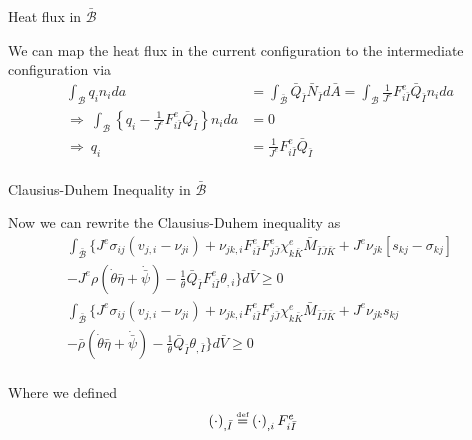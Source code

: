 \documentclass[11pt]{beamer}
\newcommand\defeq{\mathrel{\stackrel{\makebox[0pt]{\mbox{\normalfont\tiny def}}}{=}}}
\begin{document}
\begin{frame}{Heat flux in $\bar{\mathcal{B}}$}

We can map the heat flux in the current configuration to the intermediate configuration via
\begin{align*}
\int_{\mathcal{B}} q_i n_i da &= \int_{\bar{\mathcal{B}}} \bar{Q}_{\bar{I}} \bar{N}_{\bar{I}} d\bar{A} = \int_{\mathcal{B}} \frac{1}{{J^e}} {F_{i\bar{I}}^e}\bar{Q}_{\bar{I}} n_i da \\
\Rightarrow\ \int_{\mathcal{B}} \left\{q_i - \frac{1}{J^e} F_{i\bar{I}}^e \bar{Q}_{\bar{I}}\right\} n_i da&= 0\\
\Rightarrow\ q_i &= \frac{1}{J^e} F_{i\bar{I}}^e \bar{Q}_{\bar{I}}\\
\end{align*}

\end{frame}

\begin{frame}{Clausius-Duhem Inequality in $\bar{\mathcal{B}}$}

Now we can rewrite the Clausius-Duhem inequality as
\begin{align*}
\int_{\bar{\mathcal{B}}} \bigg\{{J^e} \sigma_{ij}\left( v_{j,i} - \nu_{ji}\right) + \nu_{jk,i} F_{i \bar{I}}^e F_{j\bar{J}}^e \chi_{k\bar{K}}^e  \bar{M}_{\bar{I}\bar{J}\bar{K}} + {J^e}\nu_{jk}\left[s_{kj} - \sigma_{kj}\right]\\
 - J^e \rho \left(\dot{\theta} \bar{\eta} + \dot{\bar{\psi}}\right)  - \frac{1}{\theta} \bar{Q}_{\bar{I}} F_{i\bar{I}}^e \theta_{,i} \bigg\} d\bar{V}\geq 0\\
 \int_{\bar{\mathcal{B}}} \bigg\{{J^e} \sigma_{ij}\left( v_{j,i} - \nu_{ji}\right) + \nu_{jk,i} F_{i \bar{I}}^e F_{j\bar{J}}^e \chi_{k\bar{K}}^e  \bar{M}_{\bar{I}\bar{J}\bar{K}} + {J^e}\nu_{jk} s_{kj}\\
 - \bar{\rho} \left(\dot{\theta} \bar{\eta} + \dot{\bar{\psi}}\right)  - \frac{1}{\theta} \bar{Q}_{\bar{I}} \theta_{,\bar{I}} \bigg\} d\bar{V}\geq 0\\
\end{align*}

Where we defined
\begin{align*}
\left(\cdot\right)_{,\bar{I}} &\defeq \left(\cdot\right)_{,i}F_{i\bar{I}}^e
\end{align*}

\end{frame}
\end{document}
